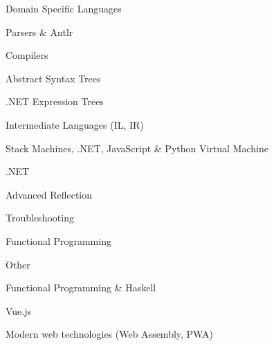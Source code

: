 \begin{cventries}

\cventry
{}
{Domain Specific Languages}
{
\begin{cvitems}
\item { Parsers \& Antlr}
\item { Compilers }
\item { Abstract Syntax Trees }
\item { .NET Expression Trees }
\item { Intermediate Languages (IL, IR) }
\item { Stack Machines, .NET, JavaScript \& Python Virtual Machine }
\end{cvitems}
}
{}
{}

\cventry
{}
{.NET}
{
\begin{cvitems}
\item { Advanced Reflection }
\item { Troubleshooting }
\item { Functional Programming }
\end{cvitems}
}
{}
{}


\cventry
{}
{Other}
{
\begin{cvitems}
\item { Functional Programming \& Haskell }
\item { Vue.js }
\item { Modern web technologies (Web Assembly, PWA) }
\end{cvitems}
}
{}
{}

\end{cventries}
